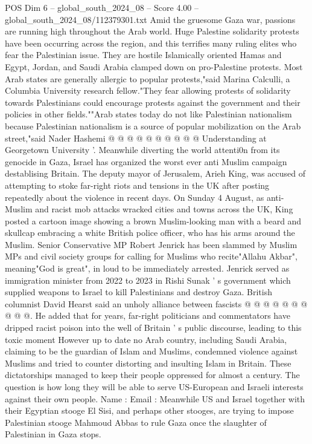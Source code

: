 \begin{textsample}{POS Dim 6 – global\_south\_2024\_08 – Score 4.00 – global\_south\_2024\_08/112379301.txt}
Amid the gruesome Gaza war, passions are running high throughout the Arab world.
Huge Palestine solidarity protests have been occurring across the region, and this terrifies many ruling elites who fear the Palestinian issue.
They are hostile Islamically oriented Hamas and Egypt, Jordan, and Saudi Arabia clamped down on pro-Palestine protests.
Most Arab states are generally allergic to popular protests,"said Marina Calculli, a Columbia University research fellow."They fear allowing protests of solidarity towards Palestinians could encourage protests against the government and their policies in other fields.""Arab states today do not like Palestinian nationalism because Palestinian nationalism is a source of popular mobilization on the Arab street,"said Nader Hashemi @ @ @ @ @ @ @ @ @ @ Understanding at Georgetown University '.
Meanwhile diverting the world attenti0n from its genocide in Gaza, Israel has organized the worst ever anti Muslim campaign destablising Britain.
The deputy mayor of Jerusalem, Arieh King, was accused of attempting to stoke far-right riots and tensions in the UK after posting repeatedly about the violence in recent days.
On Sunday 4 August, as anti-Muslim and racist mob attacks wracked cities and towns across the UK, King posted a cartoon image showing a brown Muslim-looking man with a beard and skullcap embracing a white British police officer, who has his arms around the Muslim.
Senior Conservative MP Robert Jenrick has been slammed by Muslim MPs and civil society groups for calling for Muslims who recite"Allahu Akbar", meaning"God is great", in loud to be immediately arrested.
Jenrick served as immigration minister from 2022 to 2023 in Rishi Sunak ' s government which supplied weapons to Israel to kill Palestinians and destroy Gaza.
British columnist David Hearst said an unholy alliance between fascists @ @ @ @ @ @ @ @ @ @.
He added that for years, far-right politicians and commentators have dripped racist poison into the well of Britain ' s public discourse, leading to this toxic moment However up to date no Arab country, including Saudi Arabia, claiming to be the guardian of Islam and Muslims, condemned violence against Muslims and tried to counter distorting and insulting Islam in Britain.
These dictatorships managed to keep their people oppressed for almost a century.
The question is how long they will be able to serve US-European and Israeli interests against their own people.
Name : Email : Meanwhile US and Israel together with their Egyptian stooge El Sisi, and perhaps other stooges, are trying to impose Palestinian stooge Mahmoud Abbas to rule Gaza once the slaughter of Palestinian in Gaza stops.

\end{textsample}
